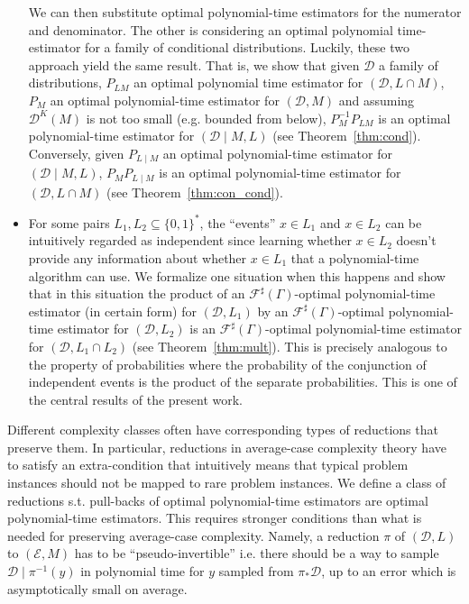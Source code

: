 \documentclass[11pt]{article}
\numberwithin{equation}{section}
\theoremstyle{definition}
\theoremstyle{plain}
\newcommand{\Bool}{\{0,1\}}
\newcommand{\Words}{{\Bool^*}}
\newcommand{\Dist}{\mathcal{D}}
\newcommand{\Fall}{\mathcal{F}}
\newcommand{\ESG}{\Fall^\sharp(\Gamma)}
\begin{document}
\begin{itemize}
We can then substitute optimal polynomial-time estimators for the numerator and denominator. The other is considering an optimal polynomial time-estimator for a family of conditional distributions. Luckily, these two approach yield the same result. That is, we show that given ${\Dist}$ a family of distributions, ${P_{LM}}$ an optimal polynomial time estimator for ${(\Dist,L \cap M)}$, ${P_M}$ an optimal polynomial-time estimator for ${(\Dist,M)}$ and assuming ${\Dist^K(M)}$ is not too small (e.g. bounded from below), ${P_M^{-1}P_{LM}}$ is an optimal polynomial-time estimator for ${(\Dist \mid M, L)}$ (see Theorem~\ref{thm:cond}). Conversely, given ${P_{L \mid M}}$ an optimal polynomial-time estimator for ${(\Dist \mid M, L)}$, ${P_M P_{L \mid M}}$ is an optimal polynomial-time estimator for ${(\Dist, L \cap M)}$ (see Theorem~\ref{thm:con_cond}).
\item
For some pairs ${L_1, L_2 \subseteq \Words}$, the \enquote{events} ${x \in L_1}$ and ${x \in L_2}$ can be intuitively regarded as independent since learning whether ${x \in L_2}$ doesn't provide any information about whether ${x \in L_1}$ that a polynomial-time algorithm can use. We formalize one situation when this happens and show that in this situation the product of an ${\ESG}$-optimal polynomial-time estimator (in certain form) for ${(\Dist,L_1)}$ by an ${\ESG}$-optimal polynomial-time estimator for ${(\Dist,L_2)}$ is an ${\ESG}$-optimal polynomial-time estimator for ${(\Dist, L_1 \cap L_2)}$ (see Theorem~\ref{thm:mult}). This is precisely analogous to the property of probabilities where the probability of the conjunction of independent events is the product of the separate probabilities. This is one of the central results of the present work.
\end{itemize}

Different complexity classes often have corresponding types of reductions that preserve them. In particular, reductions in average-case complexity theory have to satisfy an extra-condition that intuitively means that typical problem instances should not be mapped to rare problem instances. We define a class of reductions s.t. pull-backs of optimal polynomial-time estimators are optimal polynomial-time estimators. This requires stronger conditions than what is needed for preserving average-case complexity. Namely, a reduction ${\pi}$ of ${(\Dist,L)}$ to ${(\mathcal{E},M)}$ has to be \enquote{pseudo-invertible} i.e. there should be a way to sample ${\Dist \mid \pi^{-1}(y)}$ in polynomial time for ${y}$ sampled from ${\pi_* \Dist}$, up to an error which is asymptotically small on average. 
\end{document}
